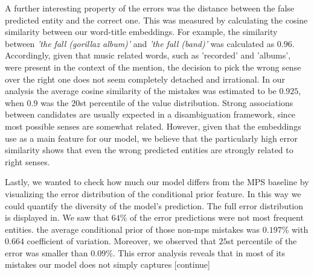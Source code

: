 \documentclass[11pt]{article}
\newcommand\toin{\todo[inline]}
\begin{document}
A further interesting property of the errors was the distance between the false predicted entity and the correct one. This was measured by calculating the cosine similarity between our word-title embeddings. For example, the similarity between \textit{'the fall (gorillaz album)'} and \textit{'the fall (band)'} was calculated as $0.96$. Accordingly, given that music related words, such as 'recorded' and 'albums', were present in the context of the mention, the decision to pick the wrong sense over the right one does not seem completely detached and irrational. In our analysis the average cosine similarity of the mistakes was estimated to be $0.925$, when $0.9$ was the $20$st percentile of the value distribution. Strong associations between candidates are usually expected in a disambiguation framework, since most possible senses are somewhat related. However, given that the embeddings use as a main feature for our model, we believe that the particularly high error similarity shows that even the wrong predicted entities are strongly related to right senses.    \toin{fix and report with Yamadas embeddings} 

Lastly, we wanted to check how much our model differs from the MPS baseline by visualizing the error distribution of the conditional prior feature. In this way we could quantify the diversity of the model's prediction. The full error distribution is displayed in. We saw that $64$\% of the error predictions were not most frequent entities. the average conditional prior of those non-mps mistakes was $0.197$\% with $0.664$ coefficient of variation.  Moreover, we observed that $25$st percentile of the error was smaller than $0.09$\%. This error analysis reveals that in most of its mistakes our model does not simply captures [continue]



\end{document}
